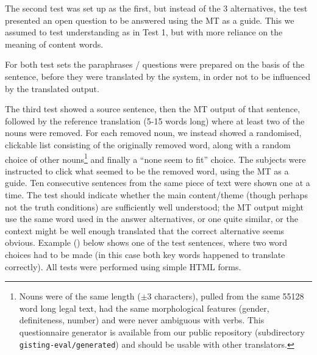 \documentclass{book}
\begin{document}
The second test was set up as the first, but instead of the 3
alternatives, the test presented an open question to be answered using
the MT as a guide. This we assumed to test understanding as in Test 1,
but with more reliance on the meaning of content words.


For both test sets the paraphrases / questions were prepared on the
basis of the \sme{} sentence, before they were translated by the
system, in order not to be influenced by the translated output.



The third test showed a \sme{} source sentence, then the MT output of
that sentence, followed by the reference translation (5-15 words long)
where at least two of the nouns were removed. For each removed noun,
we instead showed a randomised, clickable list consisting of the
originally removed word, along with a random choice of other
nouns\footnote{Nouns were of the same length ($\pm{} 3$ characters),
  pulled from the same 55128 word long legal text, had the same
  morphological features (gender, definiteness, number) and were never
  ambiguous with verbs. This questionnaire generator is available from
  our public repository (subdirectory \texttt{gisting-eval/generated})
  and should be usable with other translators.} and finally a ``none
seem to fit'' choice. The subjects were instructed to click what
seemed to be the removed word, using the MT as a guide. Ten
consecutive sentences from the same piece of text were shown one at a
time. The test should indicate whether the main content/theme (though
perhaps not the truth conditions) are sufficiently well understood;
the MT output might use the same word used in the answer alternatives,
or one quite similar, or the context might be well enough translated
that the correct alternative seems obvious. Example () below
shows one of the test sentences, where two word choices had to be made
(in this case both key words happened to translate correctly). All
tests were performed using simple HTML forms.
\end{document}
